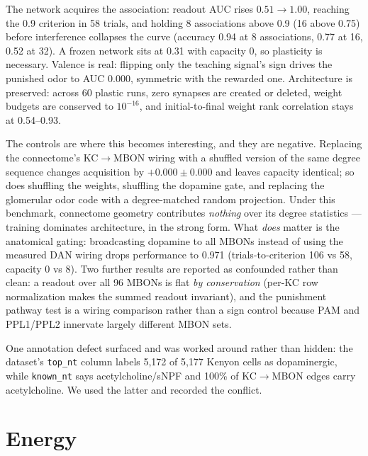 \documentclass[11pt,a4paper]{article}
\newcommand{\code}[1]{\texttt{\footnotesize #1}}
\begin{document}
The network acquires the association: readout AUC rises $0.51 \to 1.00$, reaching the 0.9
criterion in 58 trials, and holding 8 associations above 0.9 (16 above 0.75) before interference
collapses the curve (accuracy 0.94 at 8 associations, 0.77 at 16, 0.52 at 32). A frozen network
sits at 0.31 with capacity 0, so plasticity is necessary. Valence is real: flipping only the
teaching signal's sign drives the punished odor to AUC 0.000, symmetric with the rewarded one.
Architecture is preserved: across 60 plastic runs, zero synapses are created or deleted, weight
budgets are conserved to $10^{-16}$, and initial-to-final weight rank correlation stays at
0.54--0.93.

The controls are where this becomes interesting, and they are negative. Replacing the connectome's
KC$\to$MBON wiring with a shuffled version of the same degree sequence changes acquisition by
$+0.000 \pm 0.000$ and leaves capacity identical; so does shuffling the weights, shuffling the
dopamine gate, and replacing the glomerular odor code with a degree-matched random projection.
Under this benchmark, connectome geometry contributes \emph{nothing} over its degree statistics ---
training dominates architecture, in the strong form. What \emph{does} matter is the anatomical
gating: broadcasting dopamine to all MBONs instead of using the measured DAN wiring drops
performance to 0.971 (trials-to-criterion 106 vs 58, capacity 0 vs 8). Two further results are
reported as confounded rather than clean: a readout over all 96 MBONs is flat \emph{by
conservation} (per-KC row normalization makes the summed readout invariant), and the punishment
pathway test is a wiring comparison rather than a sign control because PAM and PPL1/PPL2
innervate largely different MBON sets.

One annotation defect surfaced and was worked around rather than hidden: the dataset's
\code{top\_nt} column labels 5{,}172 of 5{,}177 Kenyon cells as dopaminergic, while
\code{known\_nt} says acetylcholine/sNPF and 100\% of KC$\to$MBON edges carry acetylcholine.
We used the latter and recorded the conflict.

\FloatBarrier
\section{Energy}
\label{sec:energy}
\end{document}
